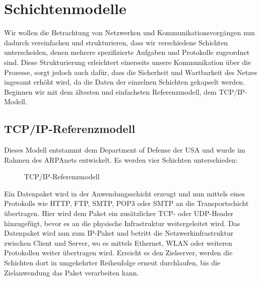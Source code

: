 \documentclass[11pt,a4paper]{scrartcl}
\begin{document}
\section{Schichtenmodelle}
Wir wollen die Betrachtung von Netzwerken und Kommunikationsvorgängen nun dadurch vereinfachen und strukturieren, dass wir verschiedene Schichten unterscheiden, denen mehrere spezifizierte Aufgaben und Protokolle zugeordnet sind. Diese Strukturierung erleichtert einerseits unsere Kommunikation über die Prozesse, sorgt jedoch auch dafür, dass die Sicherheit und Wartbarkeit des Netzes ingesamt erhöht wird, da die Daten der einzelnen Schichten gekapselt werden. Beginnen wir mit dem ältesten und einfachsten Referenzmodell, dem TCP/IP-Modell.
\subsection{TCP/IP-Referenzmodell}
Dieses Modell entstammt dem Department of Defense der USA und wurde im Rahmen des ARPAnets entwickelt. Es werden vier Schichten unterschieden:
\begin{figure}[h]
\centering
{}
\caption{TCP/IP-Referenzmodell}
\end{figure}
Ein Datenpaket wird in der Anwendungsschicht erzeugt und nun mittels eines Protokolls wie HTTP, FTP, SMTP, POP3 oder SMTP an die Transportschicht übertragen. Hier wird dem Paket ein zusätzlicher TCP- oder UDP-Header hinzugefügt, bevor es an die physische Infrastruktur weitergeleitet wird. Das Datenpaket wird nun zum IP-Paket und betritt die Netzwerkinfrastruktur zwischen Client und Server, wo es mittels Ethernet, WLAN oder weiteren Protokollen weiter übertragen wird. Erreicht es den Zielserver, werden die Schichten dort in umgekehrter Reihenfolge erneut durchlaufen, bis die Zielanwendung das Paket verarbeiten kann.
\end{document}
